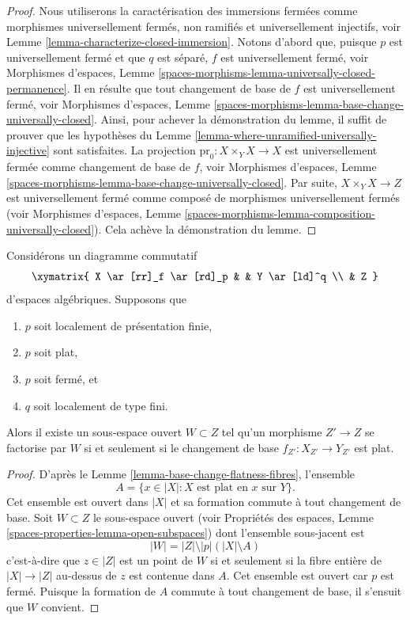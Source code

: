 \begin{proof}
Nous utiliserons la caractérisation des immersions fermées comme morphismes
universellement fermés, non ramifiés et universellement injectifs, voir
Lemme \ref{lemma-characterize-closed-immersion}.
Notons d'abord que, puisque $p$ est universellement fermé et que $q$ est
séparé, $f$ est universellement fermé, voir
Morphismes d'espaces, Lemme
\ref{spaces-morphisms-lemma-universally-closed-permanence}.
Il en résulte que tout changement de base de $f$ est universellement fermé, voir
Morphismes d'espaces, Lemme
\ref{spaces-morphisms-lemma-base-change-universally-closed}.
Ainsi, pour achever la démonstration du lemme, il suffit de prouver que
les hypothèses du
Lemme \ref{lemma-where-unramified-universally-injective}
sont satisfaites. La projection $\text{pr}_0 : X \times_Y X \to X$
est universellement fermée comme changement de base de $f$, voir
Morphismes d'espaces, Lemme
\ref{spaces-morphisms-lemma-base-change-universally-closed}.
Par suite, $X \times_Y X \to Z$ est universellement fermé comme
composé de morphismes universellement fermés (voir
Morphismes d'espaces, Lemme
\ref{spaces-morphisms-lemma-composition-universally-closed}).
Cela achève la démonstration du lemme.
\end{proof}

\begin{lemma}
\label{lemma-where-flat}
Considérons un diagramme commutatif
$$
\xymatrix{
X \ar[rr]_f \ar[rd]_p & & Y \ar[ld]^q \\
& Z
}
$$
d'espaces algébriques. Supposons que
\begin{enumerate}
\item $p$ soit localement de présentation finie,
\item $p$ soit plat,
\item $p$ soit fermé, et
\item $q$ soit localement de type fini.
\end{enumerate}
Alors il existe un sous-espace ouvert $W \subset Z$
tel qu'un morphisme $Z' \to Z$ se factorise par $W$ si et seulement si le
changement de base $f_{Z'} : X_{Z'} \to Y_{Z'}$ est plat.
\end{lemma}

\begin{proof}
D'après le Lemme \ref{lemma-base-change-flatness-fibres},
l'ensemble
$$
A = \{x \in |X| : X\text{ est plat en }x \text{ sur }Y\}.
$$
Cet ensemble est ouvert dans $|X|$ et sa formation commute à tout changement de
base. Soit $W \subset Z$ le sous-espace ouvert
(voir
Propriétés des espaces, Lemme
\ref{spaces-properties-lemma-open-subspaces})
dont l'ensemble sous-jacent est
$$
|W| = |Z| \setminus |p|\left(|X| \setminus A\right)
$$
c'est-à-dire que $z \in |Z|$ est un point de $W$ si et seulement si la fibre entière
de $|X| \to |Z|$ au-dessus de $z$ est contenue dans $A$. Cet ensemble est ouvert car
$p$ est fermé. Puisque la formation de $A$ commute à tout changement de
base, il s'ensuit que $W$ convient.
\end{proof}

